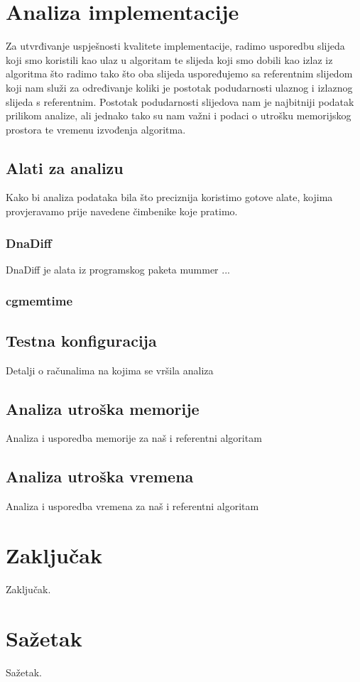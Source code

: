\documentclass[times, utf8, seminar, numeric]{fer}
\begin{document}
\chapter{Analiza implementacije}
Za utvrđivanje uspješnosti kvalitete implementacije, radimo usporedbu slijeda koji smo koristili kao ulaz u algoritam te slijeda koji smo dobili kao izlaz iz algoritma što radimo tako što oba slijeda uspoređujemo sa referentnim slijedom koji nam služi za određivanje koliki je postotak podudarnosti ulaznog i izlaznog slijeda s referentnim. Postotak podudarnosti slijedova nam je najbitniji podatak prilikom analize, ali jednako tako su nam važni i podaci o utrošku memorijskog prostora te vremenu izvođenja algoritma.
\section{Alati za analizu}
Kako bi analiza podataka bila što preciznija koristimo gotove alate, kojima provjeravamo prije navedene čimbenike koje pratimo.
\subsection{DnaDiff}
DnaDiff je alata iz programskog paketa mummer ...
\subsection{cgmemtime}
\section{Testna konfiguracija}
Detalji o računalima na kojima se vršila analiza
\section{Analiza utroška memorije}
Analiza i usporedba memorije za naš i referentni algoritam
\section{Analiza utroška vremena}
Analiza i usporedba vremena za naš i referentni algoritam

\chapter{Zaključak}
Zaključak.




\chapter{Sažetak}
Sažetak.
\end{document}
